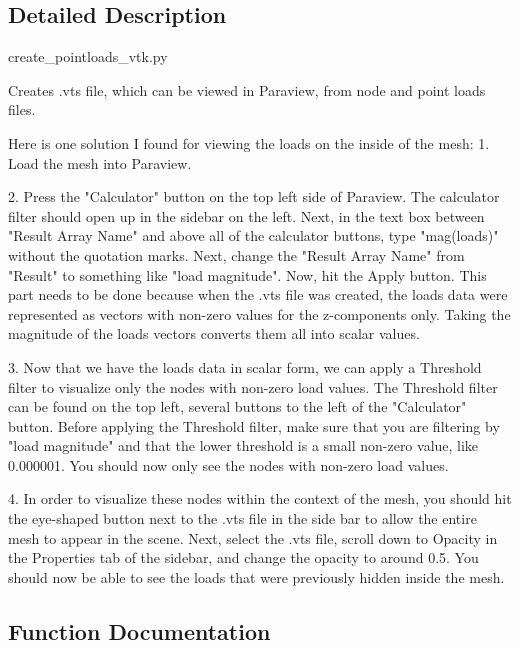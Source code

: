 \subsection{Detailed Description}
\begin{DoxyVerb}create_pointloads_vtk.py

Creates .vts file, which can be viewed in Paraview, from node and point loads
files.

Here is one solution I found for viewing the loads on the inside of the mesh:
1. Load the mesh into Paraview.

2. Press the "Calculator" button on the top left side of Paraview. The
calculator filter should open up in the sidebar on the left. Next, in the text
box between "Result Array Name" and above all of the calculator buttons, type
"mag(loads)" without the quotation marks. Next, change the "Result Array Name"
from "Result" to something like "load magnitude". Now, hit the Apply button.
This part needs to be done because when the .vts file was created, the loads
data were represented as vectors with non-zero values for the z-components only.
Taking the magnitude of the loads vectors converts them all into scalar values.

3. Now that we have the loads data in scalar form, we can apply a Threshold
filter to visualize only the nodes with non-zero load values. The Threshold
filter can be found on the top left, several buttons to the left of the
"Calculator" button. Before applying the Threshold filter, make sure that you
are filtering by "load magnitude" and that the lower threshold is a small
non-zero value, like 0.000001. You should now only see the nodes with non-zero
load values.

4. In order to visualize these nodes within the context of the mesh, you should
hit the eye-shaped button next to the .vts file in the side bar to allow the
entire mesh to appear in the scene. Next, select the .vts file, scroll down to
Opacity in the Properties tab of the sidebar, and change the opacity to around
0.5. You should now be able to see the loads that were previously hidden inside
the mesh.
\end{DoxyVerb}
 

\subsection{Function Documentation}
\hypertarget{namespacecreate__pointloads__vtk_a6ecb29d9159ba8d738c2073c7268ac4e}{}
